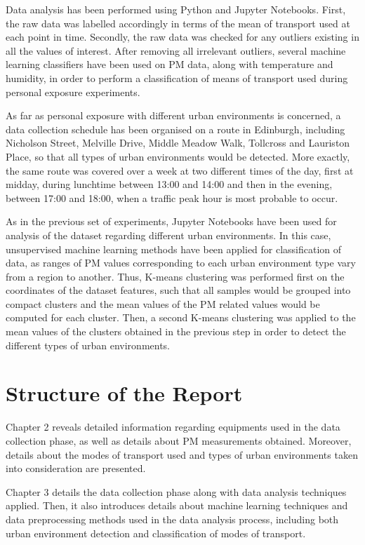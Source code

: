 \documentclass[bsc,frontabs,twoside,singlespacing,parskip,deptreport]{infthesis}     %
\begin{document}
Data analysis has been performed using Python and Jupyter Notebooks. First, the raw data was labelled accordingly in terms of the mean of transport used at each point in time. Secondly, the raw data was checked for any outliers existing in all the values of interest. After removing all irrelevant outliers, several machine learning classifiers have been used on PM data, along with temperature and humidity, in order to perform a classification of means of transport used during personal exposure experiments.

As far as personal exposure with different urban environments is concerned, a data collection schedule has been organised on a route in Edinburgh, including Nicholson Street, Melville Drive, Middle Meadow Walk, Tollcross and Lauriston Place, so that all types of urban environments would be detected. More exactly, the same route was covered over a week at two different times of the day, first at midday, during lunchtime between 13:00 and 14:00 and then in the evening, between 17:00 and 18:00, when a traffic peak hour is most probable to occur.

As in the previous set of experiments, Jupyter Notebooks have been used for analysis of the dataset regarding different urban environments. In this case, unsupervised machine learning methods have been applied for classification of data, as ranges of PM values corresponding to each urban environment type vary from a region to another. Thus, K-means clustering was performed first on the coordinates of the dataset features, such that all samples would be grouped into compact clusters and the mean values of the PM related values would be computed for each cluster. Then, a second K-means clustering was applied to the mean values of the clusters obtained in the previous step in order to detect the different types of urban environments.

\section{Structure of the Report}

Chapter 2 reveals detailed information regarding equipments used in the data collection phase, as well as details about PM measurements obtained. Moreover, details about the modes of transport used and types of urban environments taken into consideration are presented.

Chapter 3 details the data collection phase along with data analysis techniques applied. Then, it also introduces details about machine learning techniques and data preprocessing methods used in the data analysis process, including both urban environment detection and classification of modes of transport.
\end{document}

